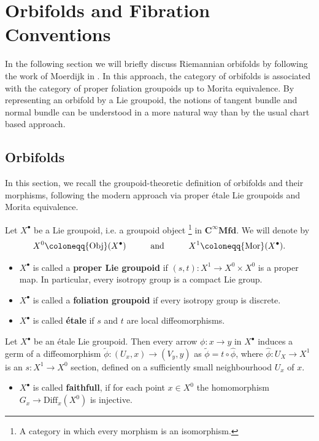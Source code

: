\documentclass[psamsfonts]{amsart}
\theoremstyle{plain}
\theoremstyle{definition}{
\newtheorem{defi}{Definition}[section]
\newtheorem{ass}{Assumption}
\newtheorem*{nota}{Notation}}
\theoremstyle{remark}{
\newtheorem{rem}{Remark}
\newtheorem{ex}{Example}}
\theoremstyle{plain}{
\newtheorem{thm}{Theorem}[section]
\newtheorem{lem}{Lemma}[section]
\newtheorem{cor}{Corollary}[section]
\newtheorem{prop}{Proposition}[section]
\newtheorem{con}{Conjecture}[section]}
\newcommand{\m}[1]{{\mathrm{#1}}}
\newcommand{\cat}[1]{\textbf{#1}}
\newcommand{\und}[1]{\hspace{#1}\text{and}\hspace{#1}}
\begin{document}
\appendix

\section{Orbifolds and Fibration Conventions}
\label{Orbifolds and Fibration Conventions}


In the following section we will briefly discuss Riemannian orbifolds by following the work of Moerdijk in \cite{moerdijk2002orbifolds}. In this approach, the category of orbifolds is associated with the category of proper foliation groupoids up to Morita equivalence. By representing an orbifold by a Lie groupoid, the notions of tangent bundle and normal bundle can be understood in a more natural way than by the usual chart based approach.

\subsection{Orbifolds}
\label{Orbifolds}

In this section, we recall the groupoid-theoretic definition of orbifolds and their morphisms, following the modern approach via proper étale Lie groupoids and Morita equivalence.


\begin{defi}
Let $X^\bullet$ be a Lie groupoid, i.e. a groupoid object \footnote{A category in which every morphism is an isomorphism.} in $\cat{C}^\infty\cat{Mfd}$. We will denote by
\begin{align*}
    X^0\coloneqq \m{Obj}(X^\bullet)\und{1.0cm}X^1\coloneqq \m{Mor}(X^\bullet).
\end{align*}

\begin{itemize}
    \item $X^\bullet$ is called a \textbf{proper Lie groupoid} if $(s,t)\colon X^1\rightarrow X^0\times X^0$ is a proper map. In particular, every isotropy group is a compact Lie group.
    \item $X^\bullet$ is called a \textbf{foliation groupoid} if every isotropy group is discrete.
    \item $X^\bullet$ is called \textbf{étale} if $s$ and $t$ are local diffeomorphisms.
\end{itemize}
Let $X^\bullet$ be an étale Lie groupoid. Then every arrow $\phi\colon x\to y$ in $X^\bullet$ induces a germ of a diffeomorphism $\tilde{\phi}\colon (U_x,x)\rightarrow (V_y,y)$ as $\tilde{\phi}=t\circ \hat{\phi}$, where $\hat{\phi}\colon U_X\rightarrow X^1$ is an $s\colon X^1\rightarrow X^0$ section, defined on a sufficiently small neighbourhood $U_x$ of $x$. 
\begin{itemize}
    \item $X^\bullet$ is called \textbf{faithfull}, if for each point $x\in X^0$ the homomorphism $G_x\rightarrow \m{Diff}_x(X^0)$ is injective.
\end{itemize}
\end{defi}
\end{document}
